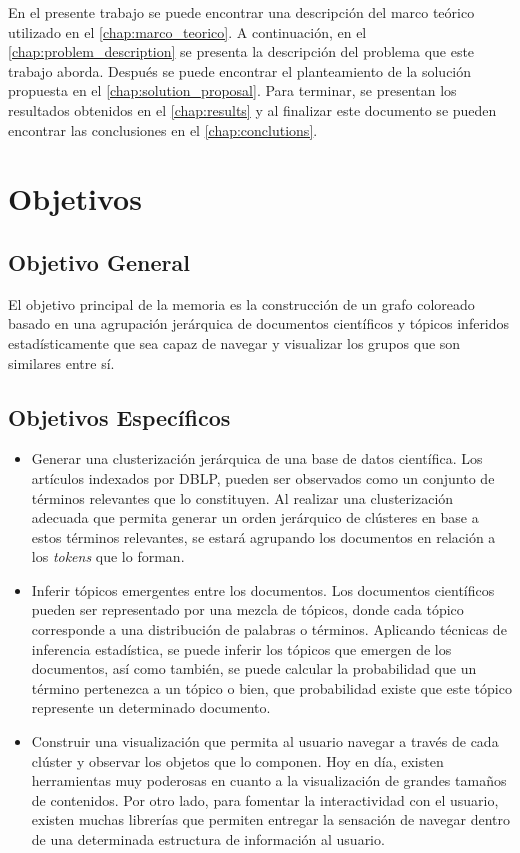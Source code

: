 \documentclass[12pt,oneside,letterpaper]{book}
\newcommand{\eng}[1]{\textit{#1}\xspace}			%
\theoremstyle{definition}
\begin{document}
En el presente trabajo se puede encontrar una descripción del marco teórico utilizado en el \autoref{chap:marco_teorico}. A continuación, en el \autoref{chap:problem_description} se presenta la descripción del problema que este trabajo aborda. Después se puede encontrar el planteamiento de la solución propuesta en el \autoref{chap:solution_proposal}. Para terminar, se presentan los resultados obtenidos en el \autoref{chap:results} y al finalizar este documento se pueden encontrar las conclusiones en el \autoref{chap:conclutions}.
\chapter{Objetivos}
\label{chap:goals}
\section{Objetivo General}
\label{sec:objetivo_general}
El objetivo principal de la memoria es la construcción de un grafo coloreado
basado en una agrupación jerárquica de documentos científicos y tópicos inferidos
estadísticamente que sea capaz de navegar y visualizar los grupos que son similares 
entre sí.

\section{Objetivos Específicos}
\label{sec:objetivos_especificos}
\begin{itemize}
	\item Generar una clusterización jerárquica de una base de datos científica.
	Los artículos indexados por DBLP, pueden ser observados como un conjunto de términos relevantes que lo constituyen. Al realizar una clusterización adecuada que permita generar un orden jerárquico de clústeres en base a estos términos relevantes, se estará agrupando los documentos en relación a los \eng{tokens} que lo forman.

	\item Inferir tópicos emergentes entre los documentos.
	Los documentos científicos pueden ser representado por una mezcla de tópicos, donde cada tópico corresponde a una distribución de palabras o términos. Aplicando técnicas de inferencia estadística, se puede inferir los tópicos que emergen de los documentos, así como también, se puede calcular la probabilidad que un término pertenezca a un tópico o bien, que probabilidad existe que este tópico represente un determinado documento.

	\item Construir una visualización que permita al usuario navegar a través de cada clúster y observar los objetos que lo componen.
	Hoy en día, existen herramientas muy poderosas en cuanto a la visualización de grandes tamaños de contenidos. Por otro lado, para fomentar la interactividad con el usuario, existen muchas librerías que permiten entregar la sensación de navegar dentro de una determinada estructura de información al usuario.
\end{itemize}
\end{document}
